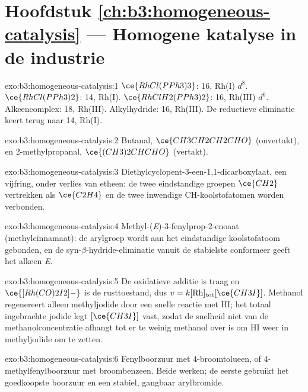 \section*{Hoofdstuk \ref{ch:b3:homogeneous-catalysis} --- Homogene katalyse in de industrie}

\begin{solution}{exo:b3:homogeneous-catalysis:1}
$\ce{RhCl(PPh3)3}$: 16, Rh(I) $d^8$. $\ce{RhCl(PPh3)2}$: 14, Rh(I). $\ce{RhClH2(PPh3)2}$: 16, Rh(III) $d^6$.
Alkeencomplex: 18, Rh(III). Alkylhydride: 16, Rh(III). De reductieve
eliminatie keert terug naar 14, Rh(I).
\end{solution}

\begin{solution}{exo:b3:homogeneous-catalysis:2}
Butanal, $\ce{CH3CH2CH2CHO}$ (onvertakt), en 2-methylpropanal, $\ce{(CH3)2CHCHO}$ (vertakt).
\end{solution}

\begin{solution}{exo:b3:homogeneous-catalysis:3}
Diethylcyclopent-3-een-1,1-dicarboxylaat, een vijfring, onder verlies van
etheen: de twee eindstandige groepen $\ce{CH2}$ vertrekken als $\ce{C2H4}$ en de twee inwendige CH-koolstofatomen
worden verbonden.
\end{solution}

\begin{solution}{exo:b3:homogeneous-catalysis:4}
Methyl-(\textit{E})-3-fenylprop-2-enoaat (methylcinnamaat): de arylgroep
wordt aan het eindstandige koolstofatoom gebonden, en de syn-$\beta$-hydride-eliminatie vanuit de stabielste conformeer
geeft het alkeen \textit{E}.
\end{solution}

\begin{solution}{exo:b3:homogeneous-catalysis:5}
De oxidatieve additie is traag en $\ce{[Rh(CO)2I2]-}$ is de rusttoestand, dus
$v = k[\mathrm{Rh}]_{\mathrm{tot}}[\ce{CH3I}]$. Methanol regenereert alleen methyljodide door een snelle reactie met HI;
het totaal ingebrachte jodide legt $[\ce{CH3I}]$ vast, zodat de snelheid niet van de
methanolconcentratie afhangt tot er te weinig methanol over is om HI weer
in methyljodide om te zetten.
\end{solution}

\begin{solution}{exo:b3:homogeneous-catalysis:6}
Fenylboorzuur met 4-broomtolueen, of 4-methylfenylboorzuur met
broombenzeen. Beide werken; de eerste gebruikt het goedkoopste boorzuur
en een stabiel, gangbaar arylbromide.
\end{solution}

